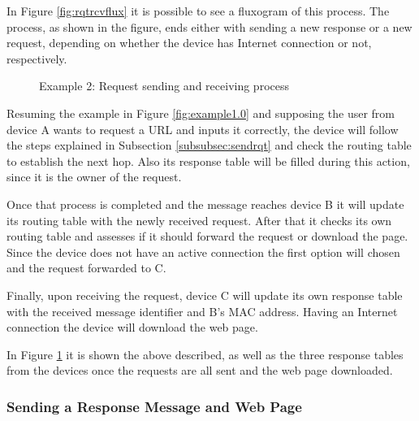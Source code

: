 In Figure \ref{fig:rqtrcvflux} it is possible to see a fluxogram of this process. The process, as shown in the figure, ends either with sending a new response or a new request, depending on whether the device has Internet connection or not, respectively.

\begin{figure}[ht]
   \noindent{}
	\caption{\label{fig:example1.1} Example 2: Request sending and receiving process}
\end{figure}

Resuming the example in Figure \ref{fig:example1.0} and supposing the user from device A wants to request a \gls{URL} and inputs it correctly, the device will follow the steps explained in Subsection \ref{subsubsec:sendrqt} and check the routing table to establish the next hop. Also its response table will be filled during this action, since it is the owner of the request.

Once that process is completed and the message reaches device B it will update its routing table with the newly received request. After that it checks its own routing table and assesses if it should forward the request or download the page. Since the device does not have an active connection the first option will chosen and the request forwarded to C.

Finally, upon receiving the request, device C will update its own response table with the received message identifier and B's \gls{MAC} address. Having an Internet connection the device will download the web page.

In Figure \ref{fig:example1.1} it is shown the above described, as well as the three response tables from the devices once the requests are all sent and the web page downloaded.

\subsubsection{Sending a Response Message and Web Page}
\label{subsubsec:sendrsp}

